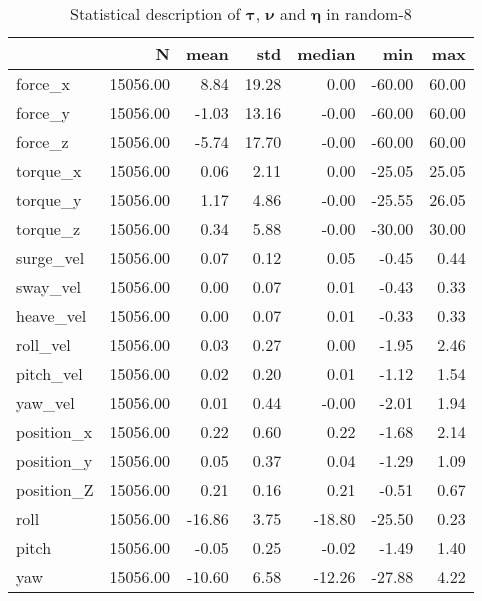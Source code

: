 \begin{table}[hb]
\centering
\caption{Statistical description of $\boldsymbol{\tau}$, $\boldsymbol{\nu}$ and $\boldsymbol{\eta}$ in random-8}
\label{tab:description-random-8}
\begin{tabular}{lrrrrrr}
\toprule
{} &        N &   mean &   std & median &    min &   max \\
\midrule
force\_x    & 15056.00 &   8.84 & 19.28 &   0.00 & -60.00 & 60.00 \\
force\_y    & 15056.00 &  -1.03 & 13.16 &  -0.00 & -60.00 & 60.00 \\
force\_z    & 15056.00 &  -5.74 & 17.70 &  -0.00 & -60.00 & 60.00 \\
torque\_x   & 15056.00 &   0.06 &  2.11 &   0.00 & -25.05 & 25.05 \\
torque\_y   & 15056.00 &   1.17 &  4.86 &  -0.00 & -25.55 & 26.05 \\
torque\_z   & 15056.00 &   0.34 &  5.88 &  -0.00 & -30.00 & 30.00 \\
surge\_vel  & 15056.00 &   0.07 &  0.12 &   0.05 &  -0.45 &  0.44 \\
sway\_vel   & 15056.00 &   0.00 &  0.07 &   0.01 &  -0.43 &  0.33 \\
heave\_vel  & 15056.00 &   0.00 &  0.07 &   0.01 &  -0.33 &  0.33 \\
roll\_vel   & 15056.00 &   0.03 &  0.27 &   0.00 &  -1.95 &  2.46 \\
pitch\_vel  & 15056.00 &   0.02 &  0.20 &   0.01 &  -1.12 &  1.54 \\
yaw\_vel    & 15056.00 &   0.01 &  0.44 &  -0.00 &  -2.01 &  1.94 \\
position\_x & 15056.00 &   0.22 &  0.60 &   0.22 &  -1.68 &  2.14 \\
position\_y & 15056.00 &   0.05 &  0.37 &   0.04 &  -1.29 &  1.09 \\
position\_Z & 15056.00 &   0.21 &  0.16 &   0.21 &  -0.51 &  0.67 \\
roll       & 15056.00 & -16.86 &  3.75 & -18.80 & -25.50 &  0.23 \\
pitch      & 15056.00 &  -0.05 &  0.25 &  -0.02 &  -1.49 &  1.40 \\
yaw        & 15056.00 & -10.60 &  6.58 & -12.26 & -27.88 &  4.22 \\
\bottomrule
\end{tabular}
\end{table}
